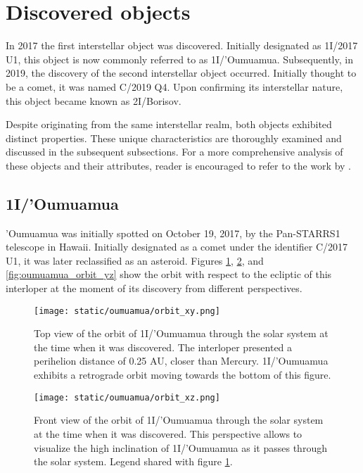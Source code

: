 \section{Discovered objects}

In 2017 the first interstellar object was discovered. Initially designated as
1I/2017 U1, this object is now commonly referred to as 1I/'Oumuamua.
Subsequently, in 2019, the discovery of the second interstellar object occurred.
Initially thought to be a comet, it was named C/2019 Q4. Upon confirming its
interstellar nature, this object became known as 2I/Borisov.

Despite originating from the same interstellar realm, both objects exhibited
distinct properties. These unique characteristics are thoroughly examined and
discussed in the subsequent subsections. For a more comprehensive analysis of
these objects and their attributes, reader is encouraged to refer to the work
by \cite{jewitt2022}.

\subsection{1I/'Oumuamua}

'Oumuamua was initially spotted on October 19, 2017, by the Pan-STARRS1
telescope in Hawaii. Initially designated as a comet under the identifier C/2017
U1, it was later reclassified as an asteroid. Figures \ref{fig:oumuamua_orbit},
\ref{fig:oumuamua_orbit_xz}, and \ref{fig:oumuamua_orbit_yz} show the orbit with
respect to the ecliptic of this interloper at the moment of its discovery from
different perspectives.

\begin{figure}[H]
  \centering
  \texttt{[image: static/oumuamua/orbit\_xy.png]}
  \caption[Top view of the orbit of 1I/'Oumuamua through the solar system]{
    Top view of the orbit of 1I/'Oumuamua through the solar system at the time when it was
    discovered. The interloper presented a perihelion distance of 0.25 AU,
    closer than Mercury. 1I/'Oumuamua exhibits a retrograde orbit moving
    towards the bottom of this figure.
  }
  \label{fig:oumuamua_orbit}
\end{figure}

\begin{figure}[H]
  \centering
  \texttt{[image: static/oumuamua/orbit\_xz.png]}
  \caption[Front view of the orbit of 1I/'Oumuamua through the solar system]{
    Front view of the orbit of 1I/'Oumuamua through the solar system at the time when it was
    discovered. This perspective allows to visualize the high inclination of
    1I/'Oumuamua as it passes through the solar system. Legend shared with
    figure \ref{fig:oumuamua_orbit}.}
  \label{fig:oumuamua_orbit_xz}
\end{figure}

